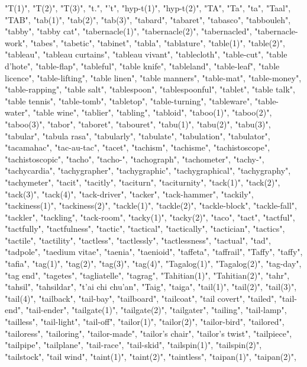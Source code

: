 "T(1)",
"T(2)",
"T(3)",
"t.",
"'t",
"hyp-t(1)",
"hyp-t(2)",
"TA",
"Ta",
"ta",
"Taal",
"TAB",
"tab(1)",
"tab(2)",
"tab(3)",
"tabard",
"tabaret",
"tabasco",
"tabbouleh",
"tabby",
"tabby cat",
"tabernacle(1)",
"tabernacle(2)",
"tabernacled",
"tabernacle-work",
"tabes",
"tabetic",
"tabinet",
"tabla",
"tablature",
"table(1)",
"table(2)",
"tableau",
"tableau curtains",
"tableau vivant",
"tablecloth",
"table-cut",
"table d'hote",
"table-flap",
"tableful",
"table knife",
"tableland",
"table-leaf",
"table licence",
"table-lifting",
"table linen",
"table manners",
"table-mat",
"table-money",
"table-rapping",
"table salt",
"tablespoon",
"tablespoonful",
"tablet",
"table talk",
"table tennis",
"table-tomb",
"tabletop",
"table-turning",
"tableware",
"table-water",
"table wine",
"tablier",
"tabling",
"tabloid",
"taboo(1)",
"taboo(2)",
"taboo(3)",
"tabor",
"taboret",
"tabouret",
"tabu(1)",
"tabu(2)",
"tabu(3)",
"tabular",
"tabula rasa",
"tabularly",
"tabulate",
"tabulation",
"tabulator",
"tacamahac",
"tac-au-tac",
"tacet",
"tachism",
"tachisme",
"tachistoscope",
"tachistoscopic",
"tacho",
"tacho-",
"tachograph",
"tachometer",
"tachy-",
"tachycardia",
"tachygrapher",
"tachygraphic",
"tachygraphical",
"tachygraphy",
"tachymeter",
"tacit",
"tacitly",
"taciturn",
"taciturnity",
"tack(1)",
"tack(2)",
"tack(3)",
"tack(4)",
"tack-driver",
"tacker",
"tack-hammer",
"tackily",
"tackiness(1)",
"tackiness(2)",
"tackle(1)",
"tackle(2)",
"tackle-block",
"tackle-fall",
"tackler",
"tackling",
"tack-room",
"tacky(1)",
"tacky(2)",
"taco",
"tact",
"tactful",
"tactfully",
"tactfulness",
"tactic",
"tactical",
"tactically",
"tactician",
"tactics",
"tactile",
"tactility",
"tactless",
"tactlessly",
"tactlessness",
"tactual",
"tad",
"tadpole",
"taedium vitae",
"taenia",
"taenioid",
"taffeta",
"taffrail",
"Taffy",
"taffy",
"tafia",
"tag(1)",
"tag(2)",
"tag(3)",
"tag(4)",
"Tagalog(1)",
"Tagalog(2)",
"tag-day",
"tag end",
"tagetes",
"tagliatelle",
"tagrag",
"Tahitian(1)",
"Tahitian(2)",
"tahr",
"tahsil",
"tahsildar",
"t'ai chi chu'an",
"Taig",
"taiga",
"tail(1)",
"tail(2)",
"tail(3)",
"tail(4)",
"tailback",
"tail-bay",
"tailboard",
"tailcoat",
"tail covert",
"tailed",
"tail-end",
"tail-ender",
"tailgate(1)",
"tailgate(2)",
"tailgater",
"tailing",
"tail-lamp",
"tailless",
"tail-light",
"tail-off",
"tailor(1)",
"tailor(2)",
"tailor-bird",
"tailored",
"tailoress",
"tailoring",
"tailor-made",
"tailor's chair",
"tailor's twist",
"tailpiece",
"tailpipe",
"tailplane",
"tail-race",
"tail-skid",
"tailspin(1)",
"tailspin(2)",
"tailstock",
"tail wind",
"taint(1)",
"taint(2)",
"taintless",
"taipan(1)",
"taipan(2)",
